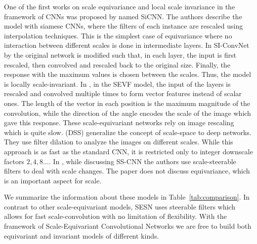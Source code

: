 \documentclass{article} \usepackage{multirow}
\def\Tabref#1{Table~\ref{#1}}
\begin{document}
One of the first works on scale equivariance and local scale invariance in the framework of CNNs 
was proposed by \citet{xu2014scale} named SiCNN.
The authors describe the model with siamese CNNs, where the filters of each instance are rescaled
using interpolation techniques.
This is the simplest case of equivariance where no interaction between different scales is done 
in intermediate layers. In SI-ConvNet by \citet{kanazawa2014locally} the original network is modified such that, 
in each layer, the input is first rescaled, then convolved and rescaled back to the original size. Finally, 
the response with the maximum values is chosen between the scales. Thus, the model is locally scale-invariant.
In \citet{marcos2018scale}, in the SEVF model, the input of the layers is 
rescaled and convolved multiple times to form vector features instead of scalar ones.
The length of the vector 
in each position is the maximum magnitude of the convolution, while the direction of the angle
encodes the scale of the image which gave this response. These scale-equivariant networks 
rely on image rescaling which is quite slow. \citet{worrall2019deep} (DSS) generalize the concept 
of scale-space to deep networks. They use filter dilation to analyze the images on different scales. 
While this approach is as fast as the standard CNN, it is restricted only to integer 
downscale factors $2,4,8\dots$.
In \citet{ghosh2019scale}, while discussing SS-CNN the authors 
use scale-steerable filters to deal with scale changes. The paper does not discuss equivariance, 
which is an important aspect for scale. 

We summarize the information about these models in \Tabref{tab:comparison}.
In contrast to other scale-equivariant models, SESN uses steerable filters which allows for 
fast scale-convolution with no limitation of flexibility. 
With the framework of Scale-Equivariant Convolutional Networks we are 
free to build both equivariant and invariant models
of different kinds. 
\end{document}
